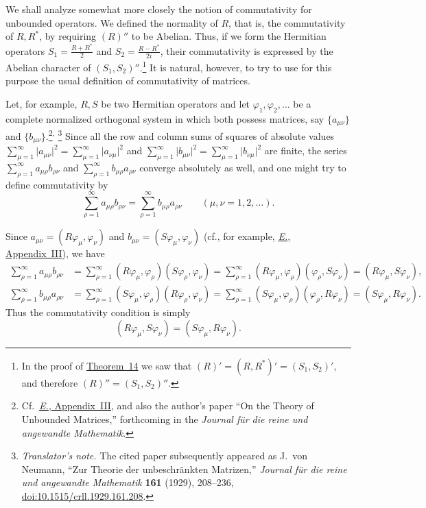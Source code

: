 \documentclass[
  paper=b5,
  twoside=true,
  fontsize=13pt,
  headings=normal,
  bookmarkpackage=false
]{scrartcl}
\theoremstyle{definition}
\newcommand{\TheoremRef}[1]{\hyperref[thm:#1]{Theorem~#1}}
\newcommand{\ErefText}[1]{\href{https://doi.org/10.1007/BF01782338}{#1}}
\newcounter{translatornote}
\newcounter{savedfootnote}
\newcommand{\TranslatorNote}[1]{%
  \stepcounter{translatornote}%
  \setcounter{savedfootnote}{\value{footnote}}%
  \begingroup
    \renewcommand{\thefootnote}{T\arabic{translatornote}}%
    \footnote{\textit{Translator's note.} #1}%
  \endgroup
  \setcounter{footnote}{\value{savedfootnote}}}
\begin{document}
We shall analyze somewhat more closely the notion of commutativity for
unbounded operators.  We defined the normality of \(R\), that is, the
commutativity of \(R,R^{*}\), by requiring \((R)''\) to be Abelian.  Thus,
if we form the Hermitian operators \(S_{1}=\frac{R+R^{*}}{2}\) and
\(S_{2}=\frac{R-R^{*}}{2i}\), their commutativity is expressed by the Abelian character of
\((S_{1},S_{2})''\).\footnote{\label{fn:72}In the proof of \TheoremRef{14} we saw that
\((R)'=(R,R^{*})'=(S_{1},S_{2})'\), and therefore
\((R)''=(S_{1},S_{2})''\).}
It is natural, however, to try to use for this purpose the usual
definition of commutativity of matrices.

Let, for example, \(R,S\) be two Hermitian operators and let
\(\varphi_{1},\varphi_{2},\ldots\) be a complete normalized orthogonal
system in which both possess matrices, say
\(\{a_{\mu\nu}\}\) and \(\{b_{\mu\nu}\}\).\footnote{\label{fn:73}Cf.\ \ErefText{\emph{E.}, Appendix~III},
and also the author's paper ``On the Theory of Unbounded Matrices,''
forthcoming in the \emph{Journal f\"ur die reine und angewandte
Mathematik}.}\textsuperscript{,}\TranslatorNote{The cited paper subsequently appeared as
J.~von Neumann, ``Zur Theorie der unbeschr\"ankten Matrizen,''
\emph{Journal f\"ur die reine und angewandte Mathematik} \textbf{161}
(1929), 208--236,
\href{https://doi.org/10.1515/crll.1929.161.208}
{doi:10.1515/crll.1929.161.208}.}
Since all the row and column sums of squares of absolute values
\(\sum_{\mu=1}^{\infty}\lvert a_{\mu\nu}\rvert^{2}
=\sum_{\mu=1}^{\infty}\lvert a_{\nu\mu}\rvert^{2}\) and
\(\sum_{\mu=1}^{\infty}\lvert b_{\mu\nu}\rvert^{2}
=\sum_{\mu=1}^{\infty}\lvert b_{\nu\mu}\rvert^{2}\) are finite, the series
\(\sum_{\rho=1}^{\infty}a_{\mu\rho}b_{\rho\nu}\) and
\(\sum_{\rho=1}^{\infty}b_{\mu\rho}a_{\rho\nu}\) converge absolutely as
well, and one might try to define commutativity by
\[
  \sum_{\rho=1}^{\infty}a_{\mu\rho}b_{\rho\nu}
  =
  \sum_{\rho=1}^{\infty}b_{\mu\rho}a_{\rho\nu}
  \qquad(\mu,\nu=1,2,\ldots).
\]

Since \(a_{\mu\nu}=(R\varphi_{\mu},\varphi_{\nu})\) and
\(b_{\mu\nu}=(S\varphi_{\mu},\varphi_{\nu})\) (cf., for example,
\ErefText{\emph{E.}, Appendix~III}), we have
\begin{align*}
  \sum_{\rho=1}^{\infty}a_{\mu\rho}b_{\rho\nu}
  &=
  \sum_{\rho=1}^{\infty}
  (R\varphi_{\mu},\varphi_{\rho})
  (S\varphi_{\rho},\varphi_{\nu})
  =
  \sum_{\rho=1}^{\infty}
  (R\varphi_{\mu},\varphi_{\rho})
  (\varphi_{\rho},S\varphi_{\nu})
  =
  (R\varphi_{\mu},S\varphi_{\nu}),\\
  \sum_{\rho=1}^{\infty}b_{\mu\rho}a_{\rho\nu}
  &=
  \sum_{\rho=1}^{\infty}
  (S\varphi_{\mu},\varphi_{\rho})
  (R\varphi_{\rho},\varphi_{\nu})
  =
  \sum_{\rho=1}^{\infty}
  (S\varphi_{\mu},\varphi_{\rho})
  (\varphi_{\rho},R\varphi_{\nu})
  =
  (S\varphi_{\mu},R\varphi_{\nu}).
\end{align*}
Thus the commutativity condition is simply
\[
  (R\varphi_{\mu},S\varphi_{\nu})
  =
  (S\varphi_{\mu},R\varphi_{\nu}).
\]
\end{document}
